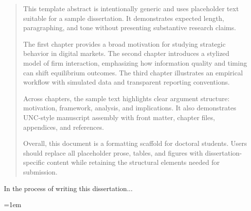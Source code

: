 \documentclass[12pt,letterpaper]{uncdissertation}
\begin{document}

\thesismaketitle
\thesismakecopyright

\doublespacing

\begin{abstract}
This template abstract is intentionally generic and uses placeholder text suitable for a sample dissertation. It demonstrates expected length, paragraphing, and tone without presenting substantive research claims.

The first chapter provides a broad motivation for studying strategic behavior in digital markets. The second chapter introduces a stylized model of firm interaction, emphasizing how information quality and timing can shift equilibrium outcomes. The third chapter illustrates an empirical workflow with simulated data and transparent reporting conventions.

Across chapters, the sample text highlights clear argument structure: motivation, framework, analysis, and implications. It also demonstrates UNC-style manuscript assembly with front matter, chapter files, appendices, and references.

Overall, this document is a formatting scaffold for doctoral students. Users should replace all placeholder prose, tables, and figures with dissertation-specific content while retaining the structural elements needed for submission.
\end{abstract}

\begin{acknowledgments}
In the process of writing this dissertation...
\end{acknowledgments}

\newpage
\begin{spacing}{1}
\begingroup
\renewcommand*{\addvspace}[1]{}
\emergencystretch=1em
\tableofcontents
\newpage
{}
\listoftables
\newpage
{}
\listoffigures
\endgroup
\end{spacing}
\end{document}
